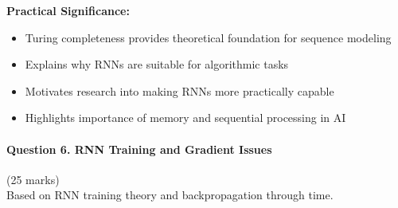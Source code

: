 \documentclass[12pt]{article}
\begin{document}
\begin{enumerate}[(a)]
{    \textbf{Practical Significance:}
    \begin{itemize}
        \item Turing completeness provides theoretical foundation for sequence modeling
        \item Explains why RNNs are suitable for algorithmic tasks
        \item Motivates research into making RNNs more practically capable
        \item Highlights importance of memory and sequential processing in AI
    \end{itemize}
    }
\end{enumerate}

\newpage
\paragraph{Question 6. RNN Training and Gradient Issues}\hfill (25 marks)\\
Based on RNN training theory and backpropagation through time.
\end{document}
